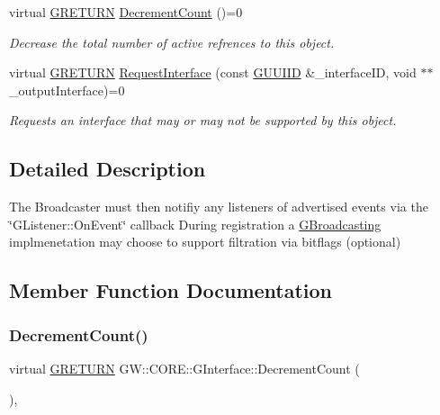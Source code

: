 \begin{DoxyCompactItemize}
virtual \hyperlink{namespace_g_w_a69b1aaebac1cac8049825f035884c95b}{G\+R\+E\+T\+U\+RN} \hyperlink{class_g_w_1_1_c_o_r_e_1_1_g_interface_af6924e12b14f217b518fc91c63d9703d}{Decrement\+Count} ()=0
\begin{DoxyCompactList}\small\item\em Decrease the total number of active refrences to this object. \end{DoxyCompactList}\item 
virtual \hyperlink{namespace_g_w_a69b1aaebac1cac8049825f035884c95b}{G\+R\+E\+T\+U\+RN} \hyperlink{class_g_w_1_1_c_o_r_e_1_1_g_interface_ab1414aa07bca310a824ee01a91657ad0}{Request\+Interface} (const \hyperlink{struct_g_w_1_1_g_u_u_i_i_d}{G\+U\+U\+I\+ID} \&\+\_\+interface\+ID, void $\ast$$\ast$\+\_\+output\+Interface)=0
\begin{DoxyCompactList}\small\item\em Requests an interface that may or may not be supported by this object. \end{DoxyCompactList}\end{DoxyCompactItemize}


\subsection{Detailed Description}
The Broadcaster must then notifiy any listeners of advertised events via the \char`\"{}\+G\+Listener\+::\+On\+Event\char`\"{} callback During registration a \hyperlink{class_g_w_1_1_c_o_r_e_1_1_g_broadcasting}{G\+Broadcasting} implmenetation may choose to support filtration via bitflags (optional) 

\subsection{Member Function Documentation}
\hypertarget{class_g_w_1_1_c_o_r_e_1_1_g_interface_af6924e12b14f217b518fc91c63d9703d}{}\label{class_g_w_1_1_c_o_r_e_1_1_g_interface_af6924e12b14f217b518fc91c63d9703d} 
\subsubsection{\texorpdfstring{Decrement\+Count()}{DecrementCount()}}
{\footnotesize\ttfamily virtual \hyperlink{namespace_g_w_a69b1aaebac1cac8049825f035884c95b}{G\+R\+E\+T\+U\+RN} G\+W\+::\+C\+O\+R\+E\+::\+G\+Interface\+::\+Decrement\+Count (\begin{DoxyParamCaption}{ }\end{DoxyParamCaption})\hspace{0.3cm}{\ttfamily [pure virtual]}, {\ttfamily [inherited]}}

